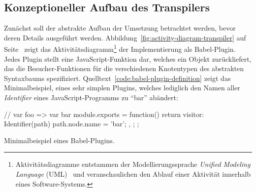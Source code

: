 \subsection{Konzeptioneller Aufbau des Transpilers}

Zunächst soll der abstrakte Aufbau der Umsetzung betrachtet werden, bevor deren Details ausgeführt werden. Abbildung~\ref{fig:activity-diagram-transpiler} auf Seite~\pageref{fig:activity-diagram-transpiler} zeigt das Aktivitätsdiagramm\footnote{Aktivitätsdiagramme entstammen der Modellierungssprache \textit{Unified Modeling Language} (UML)~\autocite{OMG:UML} und veranschaulichen den Ablauf einer Aktivität innerhalb eines Software-Systems.} der Implementierung als Babel-Plugin. Jedes Plugin stellt eine JavaScript-Funktion dar, welches ein Objekt zurückliefert, das die Besucher-Funktionen für die verschiedenen Knotentypen des abstrakten Syntaxbaums spezifiziert. Quelltext~\ref{code:babel-plugin-definition} zeigt das Minimalbeispiel, eines sehr simplen Plugins, welches lediglich den Namen aller \textit{Identifier} eines JavaScript-Programms zu \enquote{bar} abändert:

\begin{listing}[!h]
\begin{jscode}
// var foo => var bar
module.exports = function() {
  return {
    visitor: {
      Identifier(path) {
        path.node.name = 'bar';
      },
    }
  };
};
\end{jscode}
\caption{Minimalbeispiel eines Babel-Plugins.}
\label{code:babel-plugin-definition}
\end{listing}

